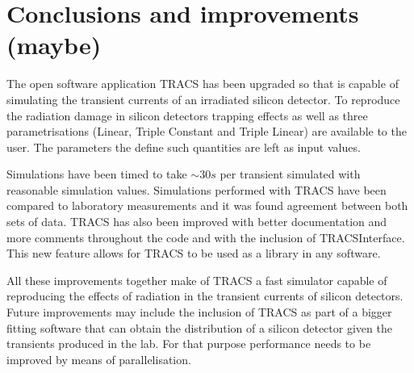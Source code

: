 \chapter{Conclusions and improvements (maybe)}

The open software application TRACS has been upgraded so that is capable of simulating the transient currents of an irradiated silicon detector. To reproduce the radiation damage in silicon detectors trapping effects as well as three \neff parametrisations (Linear, Triple Constant and Triple Linear) are available to the user. The parameters the define such quantities are left as input values.

Simulations have been timed to take $\sim 30s$ per transient simulated with reasonable simulation values. Simulations performed with TRACS have been compared to laboratory measurements and it was found agreement between both sets of data. TRACS has also been improved with better documentation and more comments throughout the code and with the inclusion of TRACSInterface. This new feature allows for TRACS to be used as a library in any software.

All these improvements together make of TRACS a fast simulator capable of reproducing the effects of radiation in the transient currents of silicon detectors. Future improvements may include the inclusion of TRACS as part of a bigger fitting software that can obtain the \neff distribution of a silicon detector given the transients produced in the lab. For that purpose performance needs to be improved by means of parallelisation.


